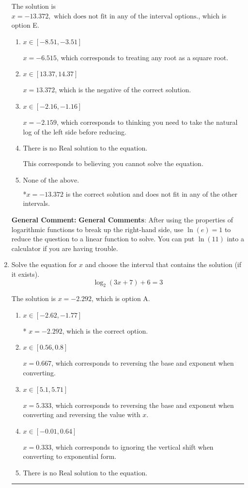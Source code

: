 \documentclass{extbook}[14pt]
\newcommand{\litem}[1]{\item #1

\rule{\textwidth}{0.4pt}}
\begin{document}
\begin{enumerate}
{The solution is \( x = -13.372, \text{ which does not fit in any of the interval options.} \), which is option E.\begin{enumerate}[label=\Alph*.]
\item \( x \in [-8.51, -3.51] \)

$x = -6.515$, which corresponds to treating any root as a square root.
\item \( x \in [13.37, 14.37] \)

$x = 13.372$, which is the negative of the correct solution.
\item \( x \in [-2.16, -1.16] \)

$x = -2.159$, which corresponds to thinking you need to take the natural log of the left side before reducing.
\item \( \text{There is no Real solution to the equation.} \)

This corresponds to believing you cannot solve the equation.
\item \( \text{None of the above.} \)

*$x = -13.372$ is the correct solution and does not fit in any of the other intervals.
\end{enumerate}

\textbf{General Comment:} \textbf{General Comments}: After using the properties of logarithmic functions to break up the right-hand side, use $\ln(e) = 1$ to reduce the question to a linear function to solve. You can put $\ln(11)$ into a calculator if you are having trouble.
}
\litem{
Solve the equation for $x$ and choose the interval that contains the solution (if it exists).
\[ \log_{2}{(3x+7)}+6 = 3 \]

The solution is \( x = -2.292 \), which is option A.\begin{enumerate}[label=\Alph*.]
\item \( x \in [-2.62, -1.77] \)

* $x = -2.292$, which is the correct option.
\item \( x \in [0.56, 0.8] \)

$x = 0.667$, which corresponds to reversing the base and exponent when converting.
\item \( x \in [5.1, 5.71] \)

$x = 5.333$, which corresponds to reversing the base and exponent when converting and reversing the value with $x$.
\item \( x \in [-0.01, 0.64] \)

$x = 0.333$, which corresponds to ignoring the vertical shift when converting to exponential form.
\item \( \text{There is no Real solution to the equation.} \)


\end{enumerate}}
\end{enumerate}
\end{document}

